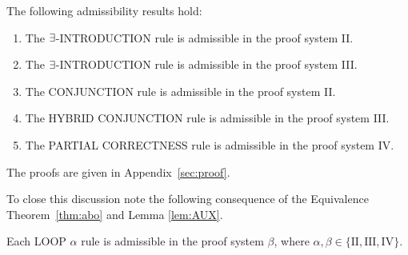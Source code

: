 \documentclass[runningheads]{llncs}       %
\begin{document}
\begin{lemma}[Admissibility] \label{lem:admissibility}
The following admissibility results hold:


 \begin{enumerate} [$(i)$] 
    
   \item The $\mbox{$\exists$}$-{\rm INTRODUCTION} rule is admissible in the proof system {\rm II}. 
   
    \vspace{2mm}
        
   \item The $\mbox{$\exists$}$-{\rm INTRODUCTION} rule is admissible in the proof system {\rm III}.
   
    \vspace{2mm}
  
   \item The {\rm CONJUNCTION} rule is admissible in the proof system {\rm II}.
   
    \vspace{2mm}

   \item The {\rm HYBRID CONJUNCTION} rule is admissible in the proof system {\rm III}.
         
    \vspace{2mm}
         
   \item The {\rm PARTIAL CORRECTNESS} rule is admissible in the proof system {\rm IV}.
   
   

 \end{enumerate}

\end{lemma}

The proofs are given in
Appendix~\ref{sec:proof}.



To close this discussion note the following consequence of the Equivalence Theorem~\ref{thm:abo}
and Lemma \ref{lem:AUX}.

\begin{corollary} \label{corr:admiss}
Each {\rm LOOP} $\alpha$ rule is admissible in the proof system $\beta$, 
        where $\alpha, \beta \in \{\mathrm{II, III, IV}\}$.
\end{corollary}
\end{document}
